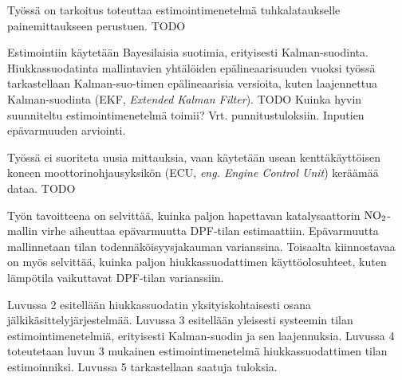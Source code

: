 Työssä on tarkoitus toteuttaa estimointimenetelmä tuhkalataukselle painemittaukseen perustuen.{\color{red} TODO}

Estimointiin käytetään Bayesilaisia suotimia, erityisesti Kalman-suodinta. Hiukkassuodatinta mallintavien yhtälöiden epälineaarisuuden vuoksi työssä tarkastellaan Kalman-suo-timen epälineaarisia versioita, kuten laajennettua Kalman-suodinta (EKF, \emph{Extended Kalman Filter}).{\color{red} TODO Kuinka hyvin suunniteltu estimointimenetelmä toimii? Vrt. punnitustuloksiin. Inputien epävarmuuden arviointi.}

Työssä ei suoriteta uusia mittauksia, vaan käytetään usean kenttäkäyttöisen koneen moottorinohjausyksikön (ECU, \emph{eng. Engine Control Unit}) keräämää dataa. {\color{red} TODO}

Työn tavoitteena on selvittää, kuinka paljon hapettavan katalysaattorin \(\ce{NO}_2\)-mallin virhe aiheuttaa epävarmuutta DPF-tilan estimaattiin. %
 Epävarmuutta mallinnetaan tilan todennäköisyysjakauman varianssina. Toisaalta kiinnostavaa on myös selvittää, kuinka paljon hiukkassuodattimen käyttöolosuhteet, kuten lämpötila vaikuttavat DPF-tilan varianssiin. 

Luvussa 2 esitellään hiukkassuodatin yksityiskohtaisesti osana jälkikäsittelyjärjestelmää.
Luvussa 3 esitellään yleisesti systeemin tilan estimointimenetelmiä, erityisesti Kalman-suodin ja sen laajennuksia.
Luvussa 4 toteutetaan luvun 3 mukainen estimointimenetelmä hiukkassuodattimen tilan estimoinniksi. Luvussa 5 tarkastellaan saatuja tuloksia.
